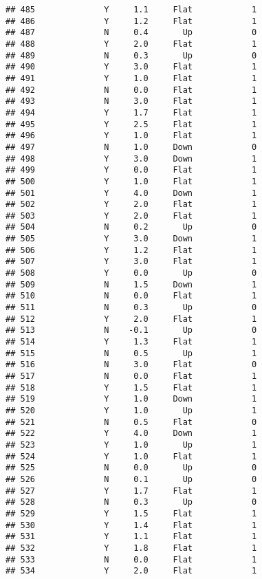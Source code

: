 \documentclass[
]{article}
\begin{document}
\begin{verbatim}
## 485              Y     1.1     Flat            1
## 486              Y     1.2     Flat            1
## 487              N     0.4       Up            0
## 488              Y     2.0     Flat            1
## 489              N     0.3       Up            0
## 490              Y     3.0     Flat            1
## 491              Y     1.0     Flat            1
## 492              N     0.0     Flat            1
## 493              N     3.0     Flat            1
## 494              Y     1.7     Flat            1
## 495              Y     2.5     Flat            1
## 496              Y     1.0     Flat            1
## 497              N     1.0     Down            0
## 498              Y     3.0     Down            1
## 499              Y     0.0     Flat            1
## 500              Y     1.0     Flat            1
## 501              Y     4.0     Down            1
## 502              Y     2.0     Flat            1
## 503              Y     2.0     Flat            1
## 504              N     0.2       Up            0
## 505              Y     3.0     Down            1
## 506              Y     1.2     Flat            1
## 507              Y     3.0     Flat            1
## 508              Y     0.0       Up            0
## 509              N     1.5     Down            1
## 510              N     0.0     Flat            1
## 511              N     0.3       Up            0
## 512              Y     2.0     Flat            1
## 513              N    -0.1       Up            0
## 514              Y     1.3     Flat            1
## 515              N     0.5       Up            1
## 516              N     3.0     Flat            0
## 517              N     0.0     Flat            1
## 518              Y     1.5     Flat            1
## 519              Y     1.0     Down            1
## 520              Y     1.0       Up            1
## 521              N     0.5     Flat            0
## 522              Y     4.0     Down            1
## 523              Y     1.0       Up            1
## 524              Y     1.0     Flat            1
## 525              N     0.0       Up            0
## 526              N     0.1       Up            0
## 527              Y     1.7     Flat            1
## 528              N     0.3       Up            0
## 529              Y     1.5     Flat            1
## 530              Y     1.4     Flat            1
## 531              Y     1.1     Flat            1
## 532              Y     1.8     Flat            1
## 533              N     0.0     Flat            1
## 534              Y     2.0     Flat            1

\end{verbatim}
\end{document}
